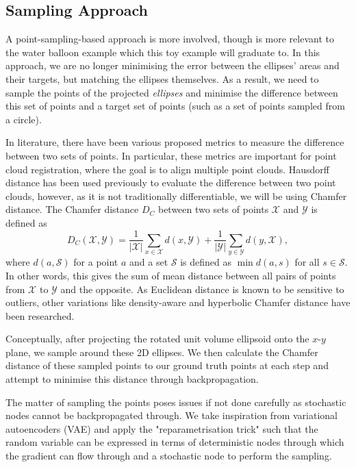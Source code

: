 \documentclass{article}
\begin{document}
\subsection{Sampling Approach}
A point-sampling-based approach is more involved, though is more relevant to the water balloon example which this toy example will graduate to. In this approach, we are no longer minimising the error between the ellipses' areas and their targets, but matching the ellipses themselves. As a result, we need to sample the points of the projected \textit{ellipses} and minimise the difference between this set of points and a target set of points (such as a set of points sampled from a circle).

In literature, there have been various proposed metrics to measure the difference between two sets of points. In particular, these metrics are important for point cloud registration, where the goal is to align multiple point clouds. Hausdorff distance has been used previously to evaluate the difference between two point clouds, however, as it is not traditionally differentiable, we will be using Chamfer distance. The Chamfer distance $D_C$ between two sets of points $\mathcal{X}$ and $\mathcal{Y}$ is defined as 
\begin{equation}
    D_C(\mathcal{X,Y})= \frac{1}{|\mathcal{X}|}\sum_{x \in \mathcal{X}} d(x, \mathcal Y) + \frac{1}{|\mathcal{Y}|}\sum_{y \in \mathcal{Y}} d(y, \mathcal X),
\end{equation}
where $d(a, \mathcal S)$ for a point $a$ and a set $\mathcal S$ is defined as $\min d(a,s)$ for all $s \in \mathcal S$. In other words, this gives the sum of mean distance between all pairs of points from $\mathcal X$ to $\mathcal Y$ and the opposite. As Euclidean distance is known to be sensitive to outliers, other variations like density-aware and hyperbolic Chamfer distance have been researched. 

Conceptually, after projecting the rotated unit volume ellipsoid onto the $x$-$y$ plane, we sample around these 2D ellipses. We then calculate the Chamfer distance of these sampled points to our ground truth points at each step and attempt to minimise this distance through backpropagation.

The matter of sampling the points poses issues if not done carefully as stochastic nodes cannot be backpropagated through. We take inspiration from variational autoencoders (VAE) and apply the "reparametrisation trick" such that the random variable can be expressed in terms of deterministic nodes through which the gradient can flow through and a stochastic node to perform the sampling.
\end{document}
